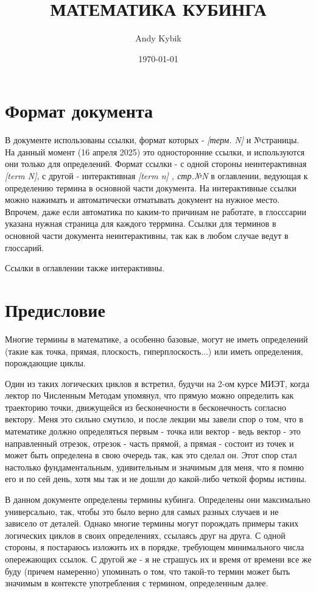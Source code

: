 \documentclass{book}
\title{МАТЕМАТИКА КУБИНГА}
\author{Andy Kybik}
\date{\today}
\begin{document}
\maketitle
\tableofcontents

\chapter{Формат документа}

В документе использованы ссылки, формат которых - \textit{[терм. N]} и №страницы. На данный момент (16 апреля 2025) это односторонние ссылки, и используются они только для определений. Формат ссылки - с одной стороны неинтерактивная \textit{[term N]}, с другой - интерактивная \textit{[term n] , стр.№N} в оглавлении, ведующая к определению термина в основной части документа. На интерактивные ссылки можно нажимать и автоматически отматывать документ на нужное место. Впрочем, даже если автоматика по каким-то причинам не работате, в глосссарии указана нужная страница для каждого террмина. Ссылки для терминов в основной части документа неинтерактивны, так как в любом случае ведут в глоссарий.

Ссылки в оглавлении также интерактивны.

\chapter{Предисловие}

Многие термины в математике, а особенно базовые, могут не иметь определений (такие как точка, прямая, плоскость, гиперплоскость...) или иметь определения, порождающие циклы. 

Один из таких логических циклов я встретил, будучи на 2-ом курсе МИЭТ, когда лектор по Численным Методам упомянул, что прямую можно определить как траекторию точки, движущейся из бесконечности в бесконечность согласно вектору. Меня это сильно смутило, и после лекции мы завели спор о том, что в математике должно определяться первым - точка или вектор - ведь вектор - это направленный отрезок, отрезок - часть прямой, а прямая - состоит из точек и может быть определена в свою очередь так, как это сделал он. Этот спор стал настолько фундаментальным, удивительным и значимым для меня, что я помню его и по сей день, хотя мы так и не дошли до какой-либо четкой формы истины.

В данном документе определены термины кубинга. Определены они максимально универсально, так, чтобы это было верно для самых разных случаев и не зависело от деталей. Однако многие термины могут порождать примеры таких логических циклов в своих определениях, ссылаясь друг на друга. С одной стороны, я постараюсь изложить их в порядке, требующем минимального числа опережающих ссылок. С другой же - я не страшусь их и время от времени все же буду (причем намеренно) упоминать о том, что такой-то термин может быть значимым в контексте употребления с термином, определенным далее.
\end{document}
